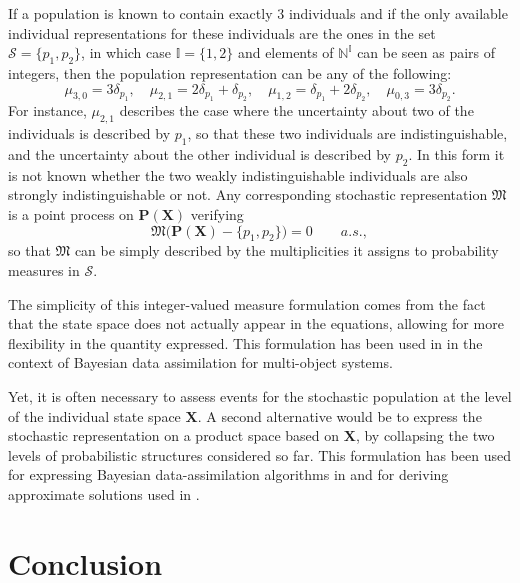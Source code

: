 \documentclass{aptpub}
\numberwithin{equation}{section}
\begin{document}
\begin{example}
If a population is known to contain exactly $3$ individuals and if the only available individual representations for these individuals are the ones in the set ${\mathcal{S}} = \{p_1,p_2\}$, in which case ${\mathbb{I}} = \{1,2\}$ and elements of ${\mathbb{N}}^{\mathbb{I}}$ can be seen as pairs of integers, then the population representation can be any of the following:
{\begin{equation*}{
\mu_{3,0} = 3\delta_{p_1}, \quad \mu_{2,1} = 2\delta_{p_1}+\delta_{p_2}, \quad \mu_{1,2} = \delta_{p_1} + 2\delta_{p_2}, \quad \mu_{0,3} = 3\delta_{p_2}.
}\end{equation*}}
For instance, $\mu_{2,1}$ describes the case where the uncertainty about two of the individuals is described by $p_1$, so that these two individuals are indistinguishable, and the uncertainty about the other individual is described by $p_2$. In this form it is not known whether the two weakly indistinguishable individuals are also strongly indistinguishable or not. Any corresponding stochastic representation ${\mathfrak{M}}$ is a point process on ${\mathbf{P}}({\mathbf{X}})$ verifying
{\begin{equation*}{
{\mathfrak{M}}\big({\mathbf{P}}({\mathbf{X}})-\{p_1,p_2\}\big) = 0 \qquad a.s.,
}\end{equation*}}
so that ${\mathfrak{M}}$ can be simply described by the multiplicities it assigns to probability measures in ${\mathcal{S}}$.
\end{example}

The simplicity of this integer-valued measure formulation comes from the fact that the state space does not actually appear in the equations, allowing for more flexibility in the quantity expressed. This formulation has been used in \cite{Delande2016_DISP} in the context of Bayesian data assimilation for multi-object systems.

Yet, it is often necessary to assess events for the stochastic population at the level of the individual state space ${\mathbf{X}}$. A second alternative would be to express the stochastic representation on a product space based on ${\mathbf{X}}$, by collapsing the two levels of probabilistic structures considered so far. This formulation has been used for expressing Bayesian data-assimilation algorithms in \cite{Delande2014_SensorControl,Delande2016_Space} and for deriving approximate solutions \cite[Chapt.~4]{Houssineau2015} used in \cite{Pailhas2016,Houssineau2015_SMC}.

\section*{Conclusion}
\end{document}
